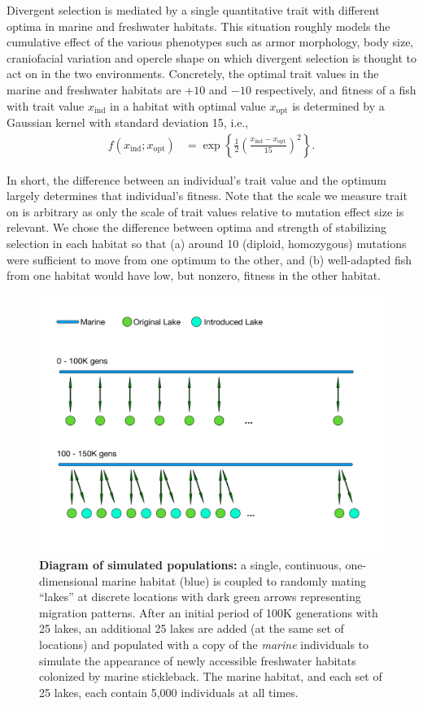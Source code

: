 \documentclass{article}
\begin{document}
Divergent selection is mediated by a single quantitative trait
with different optima in marine and freshwater habitats.
This situation roughly models the cumulative effect of the various phenotypes such as armor morphology, 
body size, craniofacial variation and opercle shape on which divergent selection is thought to act on in the two environments. 
Concretely, the optimal trait values in the marine and freshwater habitats are $+10$ and $-10$ respectively,
and fitness of a fish with trait value $x_\text{ind}$ in a habitat with optimal value $x_\text{opt}$
is determined by a Gaussian kernel with standard deviation 15, i.e.,
\begin{align*}
    f(x_\text{ind}; x_\text{opt})
    &=
    \exp\left\{
        \frac{1}{2}
            \left(
            \frac{x_\text{ind}-x_\text{opt}}{15}
            \right)^2
        \right\} .
\end{align*}

In short, the difference between an individual's trait value and the optimum largely determines that individual's fitness. 
Note that the scale we measure trait on is arbitrary as only the scale of trait values relative to mutation effect size is relevant.
We chose the difference between optima and strength of stabilizing selection in each habitat
so that 
(a) around 10 (diploid, homozygous) mutations were sufficient to move from one optimum to the other,
and (b) well-adapted fish from one habitat would have low, but nonzero, fitness in the other habitat.

\begin{figure}
	\begin{center}
  		\includegraphics[width=0.6\linewidth]{GeographyFigure.pdf}
  		\caption{
            \textbf{Diagram of simulated populations:}
            a single, continuous, one-dimensional marine habitat (blue)
            is coupled to randomly mating ``lakes'' at discrete locations with dark green arrows representing migration patterns.
            After an initial period of 100K generations with 25 lakes,
            an additional 25 lakes are added (at the same set of locations) and populated with a copy of the \textit{marine} individuals
            to simulate the appearance of newly accessible freshwater habitats colonized by marine stickleback.
            The marine habitat, and each set of 25 lakes, each contain 5,000 individuals at all times.
			}
  		\label{fig:Geo}
	\end{center}
\end{figure}
\end{document}
